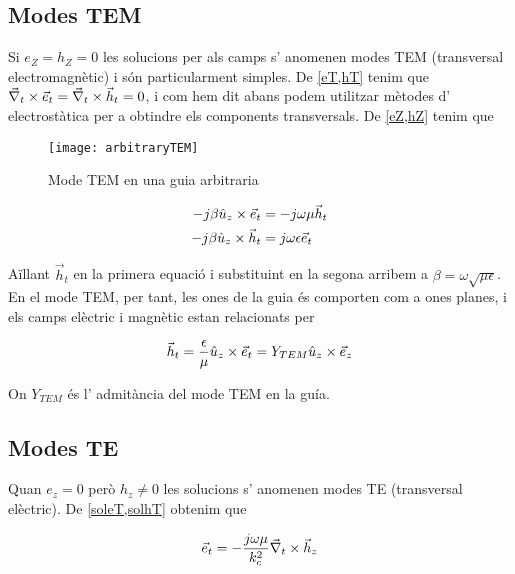\subsection{Modes TEM}

Si $e_Z = h_Z = 0 $ les solucions per als camps s' anomenen modes TEM (transversal electromagnètic) i són particularment simples. De \cref{eT,hT} tenim que $\vec \nabla_t \times \vec e_t = \vec \nabla_t \times \vec h_t = 0$, i com hem dit abans podem utilitzar mètodes d' electrostàtica per a obtindre els components transversals. De \cref{eZ,hZ} tenim que

\begin{figure}[ht]
  \centering
  \texttt{[image: arbitraryTEM]}
  \caption{Mode TEM en una guia arbitraria}
  \vspace{-1 em}
\end{figure}

\begin{subequations}
  \begin{align}
    -j \beta \hat u_z \times \vec e_t &= -j \omega \mu \vec h_t \\
    -j \beta \hat u_z \times \vec h_t &=  j \omega \epsilon \vec e_t  
  \end{align}
\end{subequations}

Aïllant $\vec h_t$ en la primera equació i substituint en la segona arribem a $\beta = \omega \sqrt{\mu \epsilon}$. En el mode TEM, per tant, les ones de la guia és comporten com a ones planes, i els camps elèctric i magnètic estan relacionats per

\begin{equation}
  \vec h_t = \frac{\epsilon}{\mu} \hat u_z \times \vec e_t = Y_{TEM} \hat u_z \times \vec e_z
\end{equation}

On $Y_{TEM}$ és l' admitància del mode TEM en la guía.

\subsection{Modes TE}

Quan $e_z = 0$ però $h_z \neq 0$ les solucions s' anomenen modes TE (transversal elèctric). De \cref{soleT,solhT} obtenim que 

\begin{equation}
  \vec e_t = - \frac{j\omega\mu}{k_c^2} \vec \nabla_t \times \vec h_z
\end{equation}

